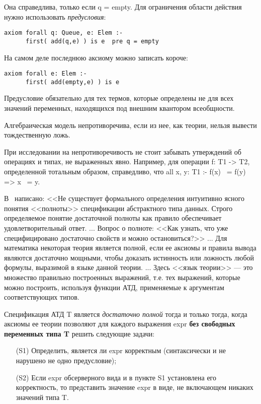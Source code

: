Она справедлива, только если q = empty. Для ограничения области действия нужно использовать \emph{предусловия}:
\begin{lstlisting}
axiom forall q: Queue, e: Elem :-
      first( add(q,e) ) is e  pre q = empty
\end{lstlisting}

На самом деле последнюю аксиому можно записать короче:
\begin{lstlisting}
axiom forall e: Elem :-
      first( add(empty,e) ) is e
\end{lstlisting}

Предусловие обязательно для тех термов, которые определены не для всех значений переменных, находящихся под внешним квантором всеобщности.


Алгебраическая модель непротиворечива, если из нее, как теории, нельзя вывести тождественную ложь.

При исследовании на непротиворечивость не стоит забывать утверждений об операциях и типах, не выраженных явно. Например, для операции f: T1 -> T2, определенной тотальным образом, справедливо, что all x, y: T1 :- f(x) ~= f(y) => x ~= y.


В~\cite{mayer} написано: <<Не существует формального определения интуитивно ясного понятия <<полноты>> спецификации абстрактного типа данных. Строго определяемое понятие достаточной полноты как правило обеспечивает удовлетворительный ответ. ... Вопрос о полноте: <<Как узнать, что уже специфицировано достаточно свойств и можно остановиться?>> ... Для математика некоторая теория является полной, если ее аксиомы и правила вывода являются достаточно мощными, чтобы доказать истинность или ложность любой формулы, выразимой в языке данной теории. ... Здесь <<язык теории>> --- это множество правильно построенных выражений, т.е. тех выражений, которые можно построить, используя функции АТД, применяемые к аргументам соответствующих типов.

Спецификация АТД T является \emph{достаточно полной} тогда и только тогда, когда аксиомы ее теории позволяют для каждого выражения expr \textbf{без свободных переменных типа T} решить следующие задачи:

\begin{itemize}
\item[(S1)] Определить, является ли expr корректным (синтаксически и не нарушено не одно предусловие);
\item[(S2)] Если expr обсерверного вида и в пункте S1 установлена его корректность, то представить значение expr в виде, не включающем никаких значений типа T.
\end{itemize}

